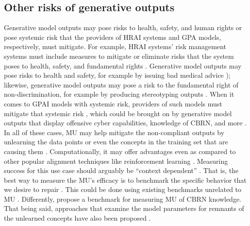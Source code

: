 \subsection{Other risks of generative outputs} 

Generative model outputs may pose risks to health, safety, and human rights or pose systemic risk that the providers of HRAI systems and GPA models, respectively, must mitigate. For example, HRAI systems' risk management systems must include measures to mitigate or eliminate risks that the system poses to health, safety, and fundamental rights \citep[Art. 9]{european_union_ai_act_2024}. Generative model outputs may pose risks to health and safety, for example by issuing bad medical advice \citep{wu2024generating, Han2024}); likewise, generative model outputs may pose a risk to the fundamental right of non-discrimination, for example by producing stereotyping outputs \citep{nicoletti2023humans}. When it comes to GPAI models with systemic risk, providers of such models must mitigate that systemic risk \citep[Art. 55]{european_union_ai_act_2024}, which could be brought on by generative model outputs  that display offensive cyber capabilities, knowledge of CBRN, and more \cite{gpai_code_2024, nist2024trustworthy}. In all of these cases, MU may help mitigate the non-compliant outputs by unlearning the data points or even the concepts in the training set that are causing them \cite{lucki2024adversarialperspectivemachineunlearning, cooper2024machineunlearningdoesntthink}. Computationally, it may offer advantages even as compared to other popular alignment techniques like reinforcement learning  \citep{yao2024largelanguagemodelunlearning}. Measuring success for this use case should arguably be ``context dependent'' \citep{yao2024largelanguagemodelunlearning}. That is, the best way to measure the MU's efficacy is to benchmark the specific behavior that we desire to repair \citep{yao2024largelanguagemodelunlearning}. This could be done using existing benchmarks unrelated to MU \cite{barez2025openproblemsmachineunlearning}. Differently, \citep{li2024wmdpbenchmarkmeasuringreducing} propose a benchmark for measuring MU of CBRN knowledge. That being said, approaches that examine the model parameters for remnants of the unlearned concepts have also been proposed \citep{hong2024intrinsicevaluationunlearningusing}.

